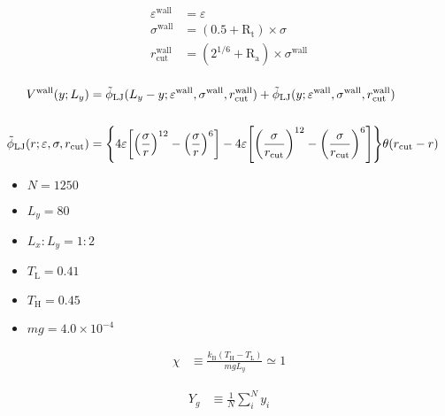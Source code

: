 \documentclass[a4paper,11pt]{jsarticle}
\numberwithin{equation}{subsection}
\begin{document}
\newpage

\begin{align}
  \varepsilon^{\text{wall}} &= \varepsilon \\
  \sigma^{\text{wall}} &= (0.5 + \text{R}_\text{t}) \times \sigma \\
  r_{\text{cut}}^{\text{wall}} &= (2^{1/6} + \text{R}_\text{a}) \times \sigma^{\text{wall}} \\
\end{align}

\begin{align}
  V^{\text{wall}}(y;L_y) &= \tilde{\phi}_{\text{LJ}}(L_y -y; \varepsilon^{\text{wall}}, \sigma^{\text{wall}}, r_{\text{cut}}^{\text{wall}}) + \tilde{\phi}_{\text{LJ}}(y; \varepsilon^{\text{wall}}, \sigma^{\text{wall}}, r_{\text{cut}}^{\text{wall}})  & \\
  \\
  \tilde{\phi}_{\text{LJ}}(r; \varepsilon, \sigma, r_{\text{cut}}) &= \qty{ 4\varepsilon \qty[\qty(\frac{\sigma}{r})^{12} - \qty(\frac{\sigma}{r})^{6} ] - 4\varepsilon \qty[\qty(\frac{\sigma}{r_{\text{cut}}})^{12} - \qty(\frac{\sigma}{r_{\text{cut}}})^{6} ] } \theta(r_{\text{cut}} - r)\\
\end{align}

\begin{itemize}
  \item $N = 1250$
  \item $L_y = 80$
  \item $L_x : L_y = 1:2$
\end{itemize}

\begin{itemize}
  \item $T_\text{L} = 0.41$
  \item $T_\text{H} = 0.45$
  \item $mg = 4.0 \times 10^{-4}$
\end{itemize}

\begin{align}
  \chi &\equiv \frac{k_{\text{B}}(T_\text{H} - T_\text{L})}{mgL_y} \simeq 1
\end{align}

\begin{align}
  Y_g &\equiv \frac{1}{N} \sum_{i}^{N} y_i
\end{align}
\end{document}
